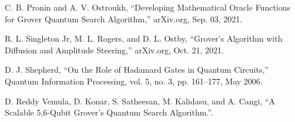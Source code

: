 \documentclass[conference]{IEEEtran}
\begin{document}
\begin{thebibliography}{00}
	  C. B. Pronin and A. V. Ostroukh, “Developing Mathematical Oracle
	Functions for Grover Quantum Search Algorithm,” arXiv.org, Sep. 03,
	2021.

	 R. L. Singleton Jr, M. L. Rogers, and D. L. Ostby, “Grover’s Algorithm
	with Diffusion and Amplitude Steering,” arXiv.org, Oct. 21, 2021.

	  D. J. Shepherd, “On the Role of Hadamard Gates in Quantum Circuits,”
	Quantum Information Processing, vol. 5, no. 3, pp. 161–177, May 2006.



	  D. Reddy Vemula, D. Konar, S. Satheesan, M. Kalidasu, and A. Cangi,
	“A Scalable 5,6-Qubit Grover’s Quantum Search Algorithm.”.
\end{thebibliography}
\end{document}
